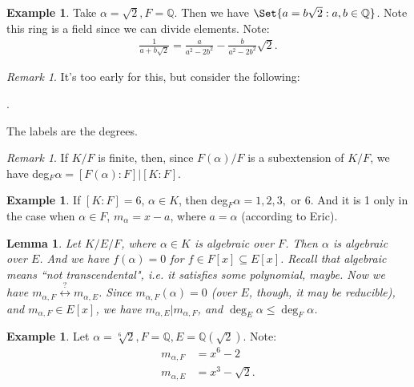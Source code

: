 \documentclass[9pt,reqno,twoside]{amsbook}
\theoremstyle{plain}
\numberwithin{section}{chapter}
\numberwithin{equation}{chapter}
\newtheorem{lem}[theorem]{Lemma}
\theoremstyle{definition}
\newtheorem{Ex}[theorem]{Example}
\theoremstyle{remark}
\newtheorem{rem}[theorem]{Remark}
\theoremstyle{plain}
\newcommand{\sub}{\subseteq}
\newcommand{\Q}{\mathbb{Q}}
\newcommand{\bee}{\begin{equation}\begin{aligned}}
\newcommand{\eee}{\end{aligned}\end{equation}}
\newcommand{\fracc}{\frac}
\renewcommand{\leq}{\leqslant}
\begin{document}
\begin{Ex}
Take $\alpha = \sqrt{2},F = \Q$. Then we have $\Set{a = b\sqrt{2}: a,b \in \Q}$. Note this ring is a field since we can divide elements. Note:
\bee
\fracc{1}{a + b\sqrt{2}} = \fracc{a}{a^2 - 2b^2} - \fracc{b}{a^2 - 2b^2}\sqrt{2}.
\eee
\end{Ex}

\begin{rem}
It's too early for this, but consider the following:
\begin{center}
.
\end{center}
The labels are the degrees. 
\end{rem}

\begin{rem}
If $K/F$ is finite, then, since $F(\alpha)/F$ is a subextension of $K/F$, we have deg$_F\alpha = [F(\alpha):F]|[K:F]$. 
\end{rem}

\begin{Ex}
If $[K:F] = 6$, $\alpha \in K$, then deg$_F\alpha = 1,2,3,$ or $6$. And it is 1 only in the case when $\alpha \in F$, $m_\alpha = x-  a$, where $a = \alpha$ (according to Eric). 
\end{Ex}


\begin{lem}
Let $K/E/F$, where $\alpha \in K$ is algebraic over $F$. Then $\alpha$ is algebraic over $E$. And we have $f(\alpha) = 0$ for $f \in F[x] \sub E[x]$. Recall that algebraic means ``not transcendental", i.e. it satisfies some polynomial, maybe. Now we have $m_{\alpha,F} \overset{?}{\leftrightarrow} m_{\alpha,E}$. Since $m_{\alpha,F}(\alpha) = 0$ (over $E$, though, it may be reducible), and $m_{\alpha,F} \in E[x]$, we have $m_{\alpha,E}|m_{\alpha,F}$, and $\deg_E\alpha \leq \deg_F\alpha$. 
\end{lem}

\begin{Ex}
Let $\alpha = \sqrt[6]{2},F = \Q,E = \Q(\sqrt{2})$. Note:
\bee
m_{\alpha,F} &= x^6 - 2\\
m_{\alpha,E} &= x^3 - \sqrt{2}.
\eee
\end{Ex}
\end{document}
